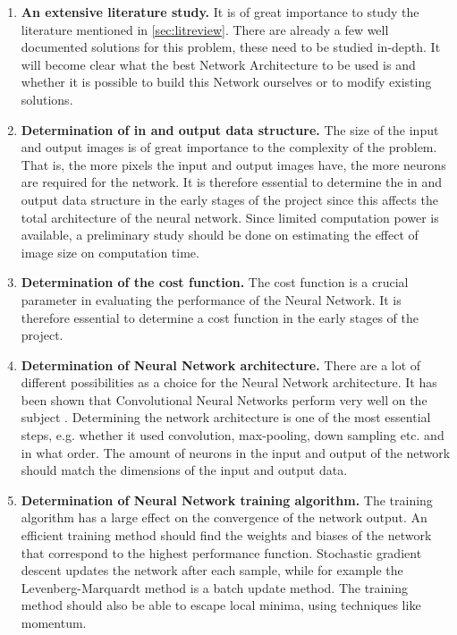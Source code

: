\begin{enumerate}
\item	\textbf{An extensive literature study.}
It is of great importance to study the literature mentioned in \ref{sec:litreview}. There are already a few well documented solutions for this problem, these need to be studied in-depth. It will become clear what the best Network Architecture to be used is and whether it is possible to build this Network ourselves or to modify existing solutions.

\item \textbf{Determination of in and output data structure.}
The size of the input and output images is of great importance to the complexity of the problem. That is, the more pixels the input and output images have, the more neurons are required for the network. It is therefore essential to determine the in and output data structure in the early stages of the project since this affects the total architecture of the neural network. Since limited computation power is available, a preliminary study should be done on estimating the effect of image size on computation time. 

\item \textbf{Determination of the cost function.}
The cost function is a crucial parameter in evaluating the performance of the Neural Network. It is therefore essential to determine a cost function in the early stages of the project.

\item \textbf{Determination of Neural Network architecture.}
There are a lot of different possibilities as a choice for the Neural Network architecture. It has been shown that Convolutional Neural Networks perform very well on the subject \cite{Dahl}. Determining the network architecture is one of the most essential steps, e.g. whether it used convolution, max-pooling, down sampling etc. and in what order. The amount of neurons in the input and output of the network should match the dimensions of the input and output data. 

\item \textbf{Determination of Neural Network training algorithm.}
The training algorithm has a large effect on the convergence of the network output. An efficient training method should find the  weights and biases of the network that correspond to the highest performance function. Stochastic gradient descent updates the network after each sample, while for example the Levenberg-Marquardt method is a batch update method\cite{Hagan}. The training method should also be able to escape local minima, using techniques like momentum.


\end{enumerate}
